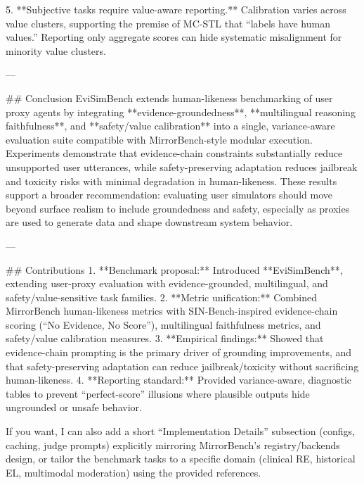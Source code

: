 5. **Subjective tasks require value-aware reporting.**  
Calibration varies across value clusters, supporting the premise of MC‑STL that “labels have human values.” Reporting only aggregate scores can hide systematic misalignment for minority value clusters.

---

## Conclusion  
EviSimBench extends human-likeness benchmarking of user proxy agents by integrating **evidence-groundedness**, **multilingual reasoning faithfulness**, and **safety/value calibration** into a single, variance-aware evaluation suite compatible with MirrorBench-style modular execution. Experiments demonstrate that evidence-chain constraints substantially reduce unsupported user utterances, while safety-preserving adaptation reduces jailbreak and toxicity risks with minimal degradation in human-likeness. These results support a broader recommendation: evaluating user simulators should move beyond surface realism to include groundedness and safety, especially as proxies are used to generate data and shape downstream system behavior.

---

## Contributions  
1. **Benchmark proposal:** Introduced **EviSimBench**, extending user-proxy evaluation with evidence-grounded, multilingual, and safety/value-sensitive task families.  
2. **Metric unification:** Combined MirrorBench human-likeness metrics with SIN-Bench-inspired evidence-chain scoring (“No Evidence, No Score”), multilingual faithfulness metrics, and safety/value calibration measures.  
3. **Empirical findings:** Showed that evidence-chain prompting is the primary driver of grounding improvements, and that safety-preserving adaptation can reduce jailbreak/toxicity without sacrificing human-likeness.  
4. **Reporting standard:** Provided variance-aware, diagnostic tables to prevent “perfect-score” illusions where plausible outputs hide ungrounded or unsafe behavior.

If you want, I can also add a short “Implementation Details” subsection (configs, caching, judge prompts) explicitly mirroring MirrorBench’s registry/backends design, or tailor the benchmark tasks to a specific domain (clinical RE, historical EL, multimodal moderation) using the provided references.